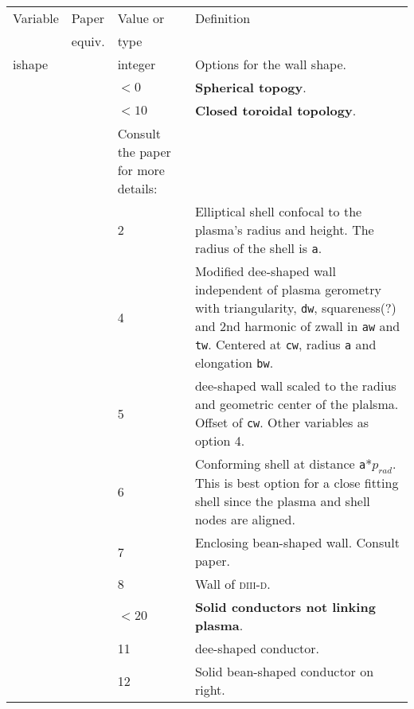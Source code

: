 \documentclass[10pt]{article}
\newcommand{\style}[1]{\texttt{#1}}
\begin{document}
\begin{center}
\begin{tabular}{|l|l|p{1.0in}|p{3.8in}|}
\hline

Variable & Paper  & Value or &  Definition \\ 
         & equiv. &  type  & \\ \hline

ishape    &       & integer & Options for the wall shape. \\
          & &$< 0$   & \textbf{Spherical topogy}. \\
          & & $< 10 $  & \textbf{Closed toroidal topology}. \\
          &   & Consult the paper for more  details:\\

          & & 2 & Elliptical shell confocal to the plasma's
          radius and height. The radius of the shell is \style{a}.\\

          & & 4 & Modified dee-shaped wall independent of plasma
          gerometry with triangularity, \style{dw}, squareness(?) and 2nd
          harmonic of zwall in \style{aw} and \style{tw}. Centered at
          \style{cw}, radius \style{a} and elongation \style{bw}.\\

        &   & 5 & dee-shaped wall scaled to the radius and
          geometric center of the plalsma. Offset of \style{cw}. Other
          variables as option 4. \\

          &       & 6  & Conforming shell at distance
          \style{a}*$p_{rad}$. This is best option for a close fitting shell
          since the plasma and shell nodes are aligned. \\

          &   & 7 & Enclosing bean-shaped wall. Consult paper.\\

          &   & 8 & Wall of \textsc{diii-d}. \\ 

          & & $< 20$  & \textbf{Solid conductors not linking plasma}.\\

          &  & 11  & dee-shaped conductor.\\

          &  & 12  & Solid bean-shaped conductor on right.\\


\end{tabular}
\end{center}
\end{document}
